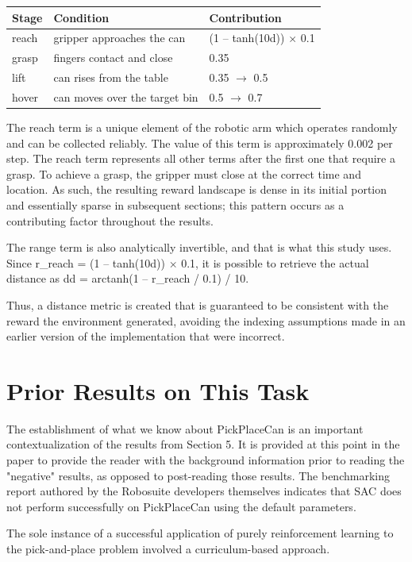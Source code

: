 \documentclass[12pt,a4paper,oneside]{report}
\begin{document}
\begin{longtable}[]{@{}lll@{}}
\toprule\noalign{}
Stage & Condition & Contribution \\
\midrule\noalign{}
\endhead
\bottomrule\noalign{}
\endlastfoot
reach & gripper approaches the can & (1 -- tanh(10d)) $\times$ 0.1 \\
grasp & fingers contact and close & 0.35 \\
lift & can rises from the table & 0.35 $\rightarrow$ 0.5 \\
hover & can moves over the target bin & 0.5 $\rightarrow$ 0.7 \\
\end{longtable}

The reach term is a unique element of the robotic arm which operates randomly and can be collected reliably. The value of this term is approximately 0.002 per step. The reach term represents all other terms after the first one that require a grasp. To achieve a grasp, the gripper must close at the correct time and location. As such, the resulting reward landscape is dense in its initial portion and essentially sparse in subsequent sections; this pattern occurs as a contributing factor throughout the results.

The range term is also analytically invertible, and that is what this study uses. Since r\_reach = (1 -- tanh(10d)) $\times$ 0.1, it is possible to retrieve the actual distance as dd = arctanh(1 -- r\_reach / 0.1) / 10.

Thus, a distance metric is created that is guaranteed to be consistent with the reward the environment generated, avoiding the indexing assumptions made in an earlier version of the implementation that were incorrect.


\hypertarget{prior-results-on-this-task}{%
\section{Prior Results on This Task}\label{prior-results-on-this-task}}
The establishment of what we know about PickPlaceCan is an important contextualization of the results from Section 5. It is provided at this point in the paper to provide the reader with the background information prior to reading the "negative" results, as opposed to post-reading those results. The benchmarking report authored by the Robosuite developers themselves indicates that SAC does not perform successfully on PickPlaceCan using the default parameters.

The sole instance of a successful application of purely reinforcement learning to the pick-and-place problem involved a curriculum-based approach.
\end{document}

